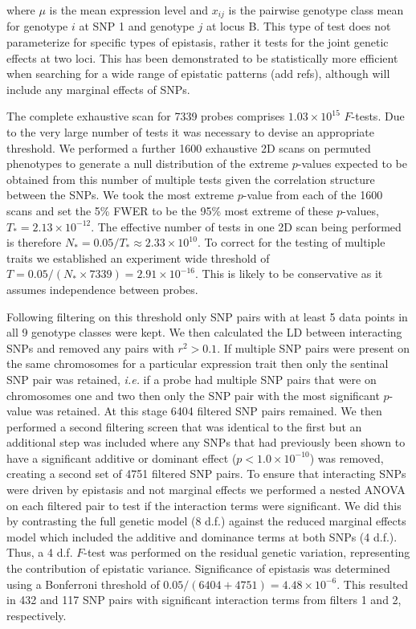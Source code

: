 \documentclass{article}
\begin{document}
where $\mu$ is the mean expression level and $x _{ij}$ is the pairwise genotype class mean for genotype $i$ at SNP 1 and genotype $j$ at locus B. This type of test does not parameterize for specific types of epistasis, rather it tests for the joint genetic effects at two loci. This has been demonstrated to be statistically more efficient when searching for a wide range of epistatic patterns (add refs), although will include any marginal effects of SNPs.
 
The complete exhaustive scan for 7339 probes comprises $1.03 \times 10^{15}$ $F$-tests. Due to the very large number of tests it was necessary to devise an appropriate threshold. We performed a further 1600 exhaustive 2D scans on permuted phenotypes to generate a null distribution of the extreme $p$-values expected to be obtained from this number of multiple tests given the correlation structure between the SNPs. We took the most extreme $p$-value from each of the 1600 scans and set the 5\% FWER to be the 95\% most extreme of these $p$-values, $T_{*} = 2.13 \times 10^{-12}$. The effective number of tests in one 2D scan being performed is therefore $N_{*} = 0.05 / T_{*} \approx 2.33 \times 10^{10}$. To correct for the testing of multiple traits we established an experiment wide threshold of $T = 0.05 / (N_{*} \times 7339) = 2.91 \times 10^{-16}$. This is likely to be conservative as it assumes independence between probes.

Following filtering on this threshold only SNP pairs with at least 5 data points in all 9 genotype classes were kept. We then calculated the LD between interacting SNPs and removed any pairs with $r^2 > 0.1$. If multiple SNP pairs were present on the same chromosomes for a particular expression trait then only the sentinal SNP pair was retained, \emph{i.e.} if a probe had multiple SNP pairs that were on chromosomes one and two then only the SNP pair with the most significant $p$-value was retained. At this stage 6404 filtered SNP pairs remained. We then performed a second filtering screen that was identical to the first but an additional step was included where any SNPs that had previously been shown to have a significant additive or dominant effect ($p < 1.0 \times 10^{-10}$) was removed, creating a second set of 4751 filtered SNP pairs. To ensure that interacting SNPs were driven by epistasis and not marginal effects we performed a nested ANOVA on each filtered pair to test if the interaction terms were significant. We did this by contrasting the full genetic model (8 d.f.) against the reduced marginal effects model which included the additive and dominance terms at both SNPs (4 d.f.). Thus, a 4 d.f. $F$-test was performed on the residual genetic variation, representing the contribution of epistatic variance. Significance of epistasis was determined using a Bonferroni threshold of $0.05 / (6404+4751) = 4.48 \times 10^{-6}$. This resulted in 432 and 117 SNP pairs with significant interaction terms from filters 1 and 2, respectively.
\end{document}
